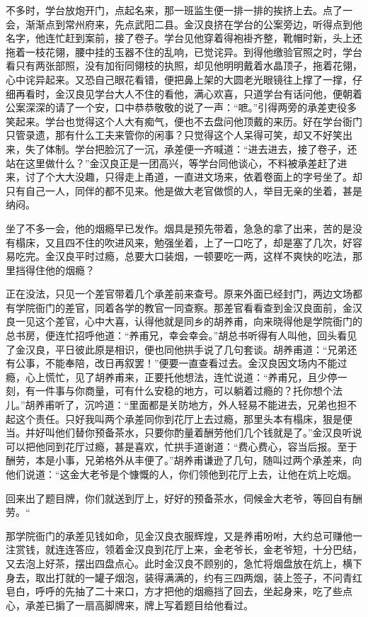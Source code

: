 \documentclass[12pt,UTF8]{ctexbook}
\begin{document}
{{{不多时，学台放炮开门，点起名来，那一班监生便一排一排的挨挤上去。点了一会，渐渐点到常州府来，先点武阳二县。金汉良挤在学台的公案旁边，听得点到他名字，他连忙赶到案前，接了卷子。学台见他穿着得袍褂齐整，靴帽时新，头上还拖着一枝花翎，腰中挂的玉器不住的乱响，已觉诧异。到得他缴验官照之时，学台看只有两张部照，没有加衔同翎枝的执照，却见他明明戴着水晶顶子，拖着花翎，心中诧异起来。又恐自己眼花看错，便把鼻上架的大圆老光眼镜往上撑了一撑，仔细再看时，金汉良见学台大人不住的看他，满心欢喜，只道学台有话问他，便朝着公案深深的请了一个安，口中恭恭敬敬的说了一声：“嗻。”引得两旁的承差吏役多笑起来。学台也觉得这个人大有痴气，便也不去盘问他顶戴的来历。好在学台衙门只管录遗，那有什么工夫来管你的闲事？只觉得这个人呆得可笑，却又不好笑出来，失了体制。学台把脸沉了一沉，承差便一齐喊道：“进去进去，接了卷子，还站在这里做什么？”金汉良正是一团高兴，等学台同他谈心，不料被承差赶了进来，讨了个大大没趣，只得走上甬道，一直进文场来，依着卷面上的字号坐了。却只有自己一人，同伴的都不见来。他是做大老官做惯的人，举目无亲的坐着，甚是纳闷。

坐了不多一会，他的烟瘾早已发作。烟具是预先带着，急急的拿了出来，苦的是没有榻床，又且四不住的吹进风来，勉强坐着，上了一口吃了，却是塞了几次，好容易吃完。金汉良平时过瘾，总要大口装烟，一顿要吃一两，这样不爽快的吃法，那里挡得住他的烟瘾？

正在没法，只见一个差官带着几个承差前来查号。原来外面已经封门，两边文场都有学院衙门的差官，同着各学的教官一同查察。那差官看看查到金汉良面前，金汉良一见这个差官，心中大喜，认得他就是同乡的胡养甫，向来晓得他是学院衙门的总书房，便连忙招呼他道：“养甫兄，幸会幸会。”胡总书听得有人叫他，回头看见了金汉良，平日彼此原是相识，便也同他拱手说了几句套谈。胡养甫道：“兄弟还有公事，不能奉陪，改日再叙罢！”便要一直查看过去。金汉良因文场内不能过瘾，心上慌忙，见了胡养甫来，正要托他想法，连忙说道：“养甫兄，且少停一刻，有一件事与你商量，可有什么安稳的地方，可以躺着过瘾的？托你想个法儿。”胡养甫听了，沉吟道：“里面都是关防地方，外人轻易不能进去，兄弟也担不起这个责任。只好我叫两个承差同你到花厅上去过瘾，那里头本有榻床，狠是便当。并好叫他们替你预备茶水，只要你酌量着酬劳他们几个钱就是了。”金汉良听说可以把他同到花厅过瘾，甚是喜欢，忙拱手道谢道：“费心费心，容当后报。至于酬劳，本是小事，兄弟格外从丰便了。”胡养甫谦逊了几句，随叫过两个承差来，向他们说道：“这金大老爷是个慷慨的人，你们领他到花厅上去，让他在炕上吃烟。

回来出了题目牌，你们就送到厅上，好好的预备茶水，伺候金大老爷，等回自有酬劳。“

那学院衙门的承差见钱如命，见金汉良衣服辉煌，又是养甫吩咐，大约总可赚他一注赏钱，就连连答应，领着金汉良到花厅上来，金老爷长，金老爷短，十分巴结，又去泡上好茶，摆出四盘点心。此时金汉良不顾别的，急忙将烟盘放在炕上，横下身去，取出打就的一罐子烟泡，装得满满的，约有三四两烟，装上签子，不问青红皂白，呼呼的先抽了二十来口，方才把他的烟瘾挡了回去，坐起身来，吃了些点心，承差已掮了一扇高脚牌来，牌上写着题目给他看过。

}}}
\end{document}
